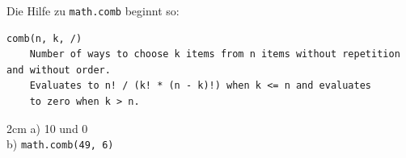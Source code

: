 \question[2]
Die Hilfe zu \texttt{math.comb} beginnt so:
\begin{lstlisting}[language={}]
comb(n, k, /)
    Number of ways to choose k items from n items without repetition and without order.
    Evaluates to n! / (k! * (n - k)!) when k <= n and evaluates
    to zero when k > n.
\end{lstlisting}
\begin{solutionbox}{2cm}
a) 10 und 0 \\
b) \texttt{math.comb(49, 6)}
\end{solutionbox}
